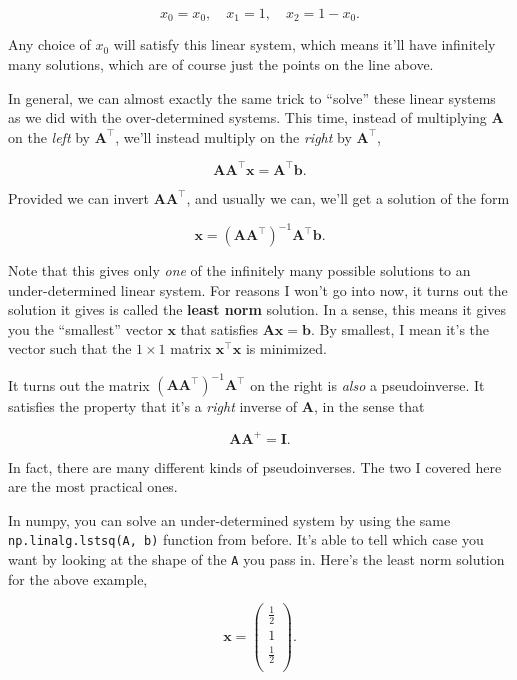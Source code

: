 \documentclass[
  letterpaper,
  DIV=11,
  numbers=noendperiod]{scrreprt}
\begin{document}
\[x_0 = x_0, \quad x_1 = 1, \quad x_2 = 1 - x_0.\]

Any choice of \(x_0\) will satisfy this linear system, which means it'll
have infinitely many solutions, which are of course just the points on
the line above.

In general, we can almost exactly the same trick to ``solve'' these
linear systems as we did with the over-determined systems. This time,
instead of multiplying \(\mathbf{A}\) on the \emph{left} by
\(\mathbf{A}^\top\), we'll instead multiply on the \emph{right} by
\(\mathbf{A}^\top\),

\[\mathbf{A}\mathbf{A}^\top \mathbf{x} = \mathbf{A}^\top \mathbf{b}.\]

Provided we can invert \(\mathbf{A}\mathbf{A}^\top\), and usually we
can, we'll get a solution of the form

\[\mathbf{x} = (\mathbf{A}\mathbf{A}^\top)^{-1} \mathbf{A}^\top \mathbf{b}.\]

Note that this gives only \emph{one} of the infinitely many possible
solutions to an under-determined linear system. For reasons I won't go
into now, it turns out the solution it gives is called the \textbf{least
norm} solution. In a sense, this means it gives you the ``smallest''
vector \(\mathbf{x}\) that satisfies
\(\mathbf{A}\mathbf{x} = \mathbf{b}\). By smallest, I mean it's the
vector such that the \(1 \times 1\) matrix
\(\mathbf{x}^\top \mathbf{x}\) is minimized.

It turns out the matrix
\((\mathbf{A}\mathbf{A}^\top)^{-1} \mathbf{A}^\top\) on the right is
\emph{also} a pseudoinverse. It satisfies the property that it's a
\emph{right} inverse of \(\mathbf{A}\), in the sense that

\[\mathbf{A} \mathbf{A}^+ = \mathbf{I}.\]

In fact, there are many different kinds of pseudoinverses. The two I
covered here are the most practical ones.

In numpy, you can solve an under-determined system by using the same
\texttt{np.linalg.lstsq(A,\ b)} function from before. It's able to tell
which case you want by looking at the shape of the \texttt{A} you pass
in. Here's the least norm solution for the above example,

\[
\mathbf{x} = 
\begin{pmatrix}
\frac{1}{2} \\
1 \\
\frac{1}{2} \\
\end{pmatrix}.
\]
\end{document}
